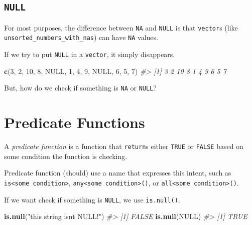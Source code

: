 \documentclass[
]{report}
\newenvironment{Shaded}{\begin{snugshade}}{\end{snugshade}}
\newcommand{\CommentTok}[1]{\textcolor[rgb]{0.56,0.35,0.01}{\textit{#1}}}
\newcommand{\DecValTok}[1]{\textcolor[rgb]{0.00,0.00,0.81}{#1}}
\newcommand{\KeywordTok}[1]{\textcolor[rgb]{0.13,0.29,0.53}{\textbf{#1}}}
\newcommand{\NormalTok}[1]{#1}
\newcommand{\OtherTok}[1]{\textcolor[rgb]{0.56,0.35,0.01}{#1}}
\newcommand{\StringTok}[1]{\textcolor[rgb]{0.31,0.60,0.02}{#1}}
\begin{document}
\hypertarget{null}{%
\subsection{\texorpdfstring{\texttt{NULL}}{NULL}}\label{null}}

For most purposes, the difference between \texttt{NA} and \texttt{NULL} is that \texttt{vector}s (like \texttt{unsorted\_numbers\_with\_nas}) can have \texttt{NA} values.

If we try to put \texttt{NULL} in a \texttt{vector}, it simply disappears.

\begin{Shaded}
\begin{Highlighting}[]
\KeywordTok{c}\NormalTok{(}\DecValTok{3}\NormalTok{, }\DecValTok{2}\NormalTok{, }\DecValTok{10}\NormalTok{, }\DecValTok{8}\NormalTok{, }\OtherTok{NULL}\NormalTok{, }\DecValTok{1}\NormalTok{, }\DecValTok{4}\NormalTok{, }\DecValTok{9}\NormalTok{, }\OtherTok{NULL}\NormalTok{, }\DecValTok{6}\NormalTok{, }\DecValTok{5}\NormalTok{, }\DecValTok{7}\NormalTok{)}
\CommentTok{\#\textgreater{}  [1]  3  2 10  8  1  4  9  6  5  7}
\end{Highlighting}
\end{Shaded}

But, how do we check if something is \texttt{NA} or \texttt{NULL}?

\hypertarget{predicate-functions}{%
\section{Predicate Functions}\label{predicate-functions}}

A \emph{predicate function} is a function that \texttt{return}s either \texttt{TRUE} or \texttt{FALSE} based on some condition the function is checking.

Predicate function (should) use a name that expresses this intent, such as \texttt{is\textless{}some\ condition\textgreater{}}, \texttt{any\textless{}some\ condition\textgreater{}()}, or \texttt{all\textless{}some\ condition\textgreater{}()}.

If we want check if something is \texttt{NULL}, we use \texttt{is.null()}.

\begin{Shaded}
\begin{Highlighting}[]
\KeywordTok{is.null}\NormalTok{(}\StringTok{"this string isn\textquotesingle{}t NULL!"}\NormalTok{)}
\CommentTok{\#\textgreater{} [1] FALSE}
\KeywordTok{is.null}\NormalTok{(}\OtherTok{NULL}\NormalTok{)}
\CommentTok{\#\textgreater{} [1] TRUE}
\end{Highlighting}
\end{Shaded}
\end{document}
